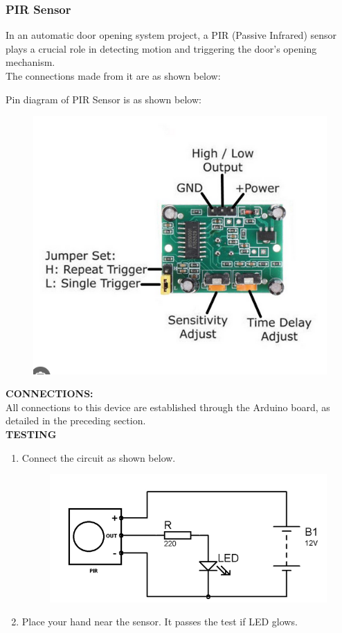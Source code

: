 \documentclass{article}
\begin{document}
\subsubsection{PIR Sensor}
In an automatic door opening system project, a PIR (Passive Infrared) sensor plays a crucial role in detecting motion and triggering the door's opening mechanism. \\
The connections made from it are as shown below:

Pin diagram of PIR Sensor is as shown below:
\begin{figure}[H]
\centering
\includegraphics[scale = 0.5]{./figs/pirpindia.png}
\end{figure}
\textbf{CONNECTIONS:\\}
All connections to this device are established through the Arduino board, as detailed in the preceding section. \\
\textbf{TESTING}
\begin{enumerate}
\item Connect the circuit as shown below. \\
\begin{figure}[H]
\centering
\includegraphics[scale = 0.5]{./figs/pirtest.png}
\end{figure}
\item Place your hand near the sensor. It passes the test if LED glows.
\end{enumerate}
\end{document}
